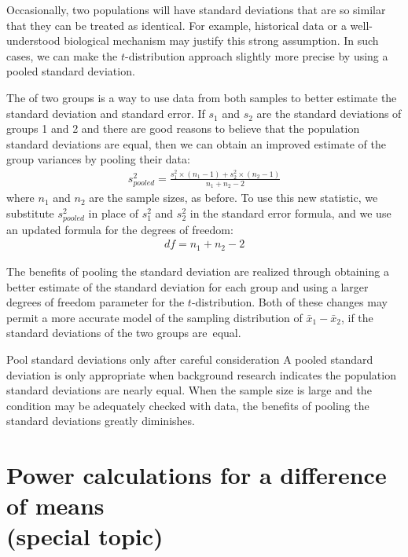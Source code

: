 {Occasionally, two populations will have standard deviations that are so similar that they can be treated as identical. For example, historical data or a well-understood biological mechanism may justify this strong assumption. In such cases, we can make the $t$-distribution approach slightly more precise by using a pooled standard deviation.

The  of two groups is a way to use data from both samples to better estimate the standard deviation and standard error. If $s_1^{}$ and $s_2^{}$ are the standard deviations of groups 1 and 2 and there are good reasons to believe that the population standard deviations are equal, then we can obtain an improved estimate of the group variances by pooling their data:
\begin{align*}
s_{pooled}^2 = \frac{s_1^2\times (n_1-1) + s_2^2\times (n_2-1)}{n_1 + n_2 - 2}
\end{align*}
where $n_1$ and $n_2$ are the sample sizes, as before. To use this new statistic, we substitute $s_{pooled}^2$ in place of $s_1^2$ and $s_2^2$ in the standard error formula, and we use an updated formula for the degrees of freedom:
\begin{align*}
df = n_1 + n_2 - 2
\end{align*}

The benefits of pooling the standard deviation are realized through obtaining a better estimate of the standard deviation for each group and using a larger degrees of freedom parameter for the $t$-distribution. Both of these changes may permit a more accurate model of the sampling distribution of $\bar{x}_1 - \bar{x}_2$, if the standard deviations of the two groups are~equal.

\begin{caution}
{Pool standard deviations only after careful consideration}
{A pooled standard deviation is only appropriate when background research indicates the population standard deviations are nearly equal. When the sample size is large and the condition may be adequately checked with data, the benefits of pooling the standard deviations greatly diminishes.}
\end{caution}
}



\section[Power calculations for a difference of means (special topic)]{Power calculations for a difference of means\\ (special topic)}
\label{PowerForDifferenceOfTwoMeans}


